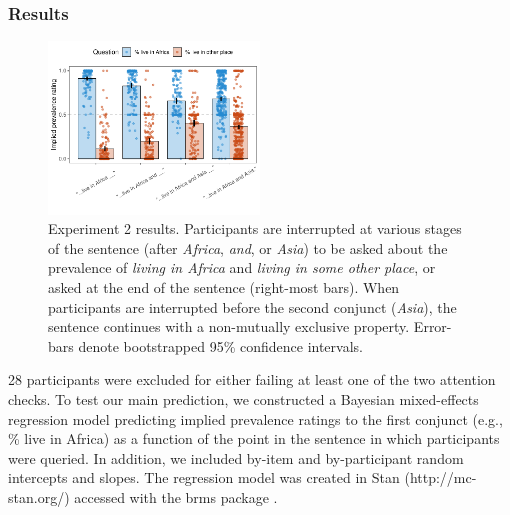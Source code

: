 \documentclass[10pt,letterpaper]{article}
\newcommand{\mh}[1]{{\textcolor{Blue}{[mh: #1]}}}
\begin{document}
 \subsubsection{Results}
 \vspace{-0.5cm}
\begin{figure}[h]
  \centering
    \includegraphics[width=0.5\textwidth]{expt3_summary}
    \vspace{-1.2cm}
  \caption{Experiment 2 results. Participants are interrupted at various stages of the sentence (after \emph{Africa}, \emph{and}, or \emph{Asia}) to be asked about the prevalence of \emph{living in Africa} and \emph{living in some other place}, or asked at the end of the sentence (right-most bars). When participants are interrupted before the second conjunct (\emph{Asia}), the sentence continues with a non-mutually exclusive property. Error-bars denote bootstrapped 95\% confidence intervals.}
    \label{fig:expt3}
        \vspace{-0.5cm}
  \end{figure}
  
% 

28 participants were excluded for either failing at least one of the two attention checks.
To test our main prediction, we constructed a Bayesian mixed-effects regression model predicting implied prevalence ratings to the first conjunct (e.g., \% live in Africa) as a function of the point in the sentence in which participants were queried. 
In addition, we included by-item and by-participant random intercepts and slopes. 
The regression model was created in Stan (http://mc-stan.org/) accessed with the brms package \cite{burkner_brms_2017}.
\end{document}
